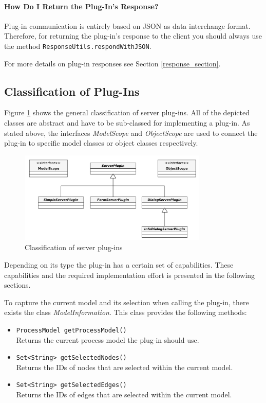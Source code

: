 \paragraph{How Do I Return the Plug-In's Response?}
Plug-in communication is entirely based on JSON as data interchange format.
Therefore, for returning the plug-in's response to the client you should always
use the method \verb!ResponseUtils.respondWithJSON!.

For more details on plug-in responses see Section \ref{response_section}.

\subsection{Classification of Plug-Ins}
Figure \ref{overview} shows the general classification of server plug-ins. All
of the depicted classes are abstract and 
have to be sub-classed for implementing a plug-in. As stated above, the
interfaces \textit{ModelScope} and \textit{ObjectScope} are used to connect the
plug-in to specific model classes or object classes respectively.

\begin{figure}[ht]
	\centering
	\includegraphics[width=0.8\textwidth]{graphics/pluginclasses}
	\caption{Classification of server plug-ins}
	\label{overview}
\end{figure}

Depending on its type the plug-in has a certain set of capabilities. These
capabilities and the required implementation effort is presented in the
following sections.

To capture the current model and its selection when calling the plug-in, there
exists the class \textit{ModelInformation}.
This class provides the following methods:
\begin{itemize}
	\item \verb!ProcessModel getProcessModel()! \\ Returns the current
process model the plug-in should use.
	\item \verb!Set<String> getSelectedNodes()! \\ Returns the IDs of
nodes that are selected within the current model.
	\item \verb!Set<String> getSelectedEdges()! \\ Returns the IDs of
edges that are selected within the current model.
\end{itemize}

